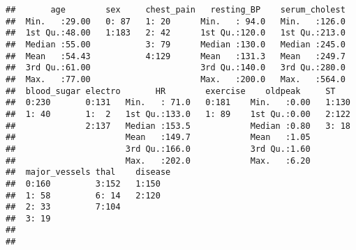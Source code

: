 \documentclass[]{article}
\newenvironment{Shaded}{\begin{snugshade}}{\end{snugshade}}
\newcommand{\KeywordTok}[1]{\textcolor[rgb]{0.13,0.29,0.53}{\textbf{#1}}}
\newcommand{\StringTok}[1]{\textcolor[rgb]{0.31,0.60,0.02}{#1}}
\newcommand{\CommentTok}[1]{\textcolor[rgb]{0.56,0.35,0.01}{\textit{#1}}}
\newcommand{\OperatorTok}[1]{\textcolor[rgb]{0.81,0.36,0.00}{\textbf{#1}}}
\newcommand{\NormalTok}[1]{#1}
\begin{document}
\begin{Shaded}
\end{Shaded}

\begin{verbatim}
##       age        sex     chest_pain   resting_BP    serum_cholest  
##  Min.   :29.00   0: 87   1: 20      Min.   : 94.0   Min.   :126.0  
##  1st Qu.:48.00   1:183   2: 42      1st Qu.:120.0   1st Qu.:213.0  
##  Median :55.00           3: 79      Median :130.0   Median :245.0  
##  Mean   :54.43           4:129      Mean   :131.3   Mean   :249.7  
##  3rd Qu.:61.00                      3rd Qu.:140.0   3rd Qu.:280.0  
##  Max.   :77.00                      Max.   :200.0   Max.   :564.0  
##  blood_sugar electro       HR        exercise    oldpeak     ST     
##  0:230       0:131   Min.   : 71.0   0:181    Min.   :0.00   1:130  
##  1: 40       1:  2   1st Qu.:133.0   1: 89    1st Qu.:0.00   2:122  
##              2:137   Median :153.5            Median :0.80   3: 18  
##                      Mean   :149.7            Mean   :1.05          
##                      3rd Qu.:166.0            3rd Qu.:1.60          
##                      Max.   :202.0            Max.   :6.20          
##  major_vessels thal    disease
##  0:160         3:152   1:150  
##  1: 58         6: 14   2:120  
##  2: 33         7:104          
##  3: 19                        
##                               
## 
\end{verbatim}
\end{document}
